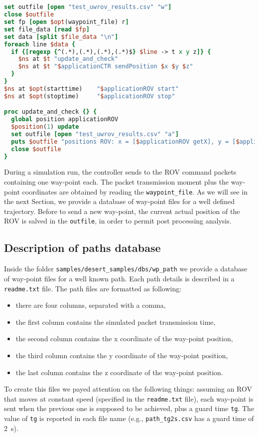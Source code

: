 \documentclass[11pt]{article}
\begin{document}
\ 
{\scriptsize\tt
\begin{lstlisting}[language=tcl]  
set outfile [open "test_uwrov_results.csv" "w"]
close $outfile
set fp [open $opt(waypoint_file) r]
set file_data [read $fp]
set data [split $file_data "\n"]
foreach line $data {
  if {[regexp {^(.*),(.*),(.*),(.*)$} $line -> t x y z]} {
    $ns at $t "update_and_check"
    $ns at $t "$applicationCTR sendPosition $x $y $z"
  }
}
$ns at $opt(starttime)    "$applicationROV start"
$ns at $opt(stoptime)     "$applicationROV stop"

proc update_and_check {} {
  global position applicationROV
  $position(1) update
  set outfile [open "test_uwrov_results.csv" "a"]
  puts $outfile "positions ROV: x = [$applicationROV getX], y = [$applicationROV getY], z =  [$applicationROV getZ]" 
  close $outfile
}

\end{lstlisting}
}

During a simulation run, the controller sends to the ROV command packets containing one way-point each. The packet transmission moment plus the way-point coordinates are obtained by reading the {\tt waypoint\_file}. As we will see in the next Section, we provide a database of way-point files for a well defined trajectory.  Before to send a new way-point, the current actual position of the ROV is salved in the {\tt outfile}, in order to permit post processing analysis.

\subsection{Description of paths database}
Inside the folder {\tt samples/desert\_samples/dbs/wp\_path} we provide a database of way-point files for a well known path. Each path details is described in a {\tt readme.txt} file. The path files are formatted as following:
\begin{itemize}
 \item there are four columns, separated with a comma,
 \item the first column contains the simulated packet transmission time,
 \item the second column contains the x coordinate of the way-point position,
 \item the third column contains the y coordinate of the way-point position,
 \item the last column contains the z coordinate of the way-point position.
\end{itemize}
To create this files we payed attention on the following things: assuming an ROV that moves at constant speed (specified in the {\tt readme.txt} file), each way-point is sent when the previous one is supposed to be achieved, plus a guard time {\tt tg}. The value of {\tt tg} is reported in each file name (e.g., {\tt path\_tg2s.csv} has a guard time of 2~s).
\end{document}
